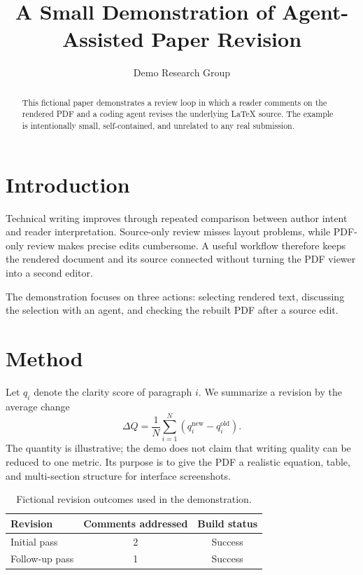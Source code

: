 \documentclass[10pt]{article}
\title{A Small Demonstration of Agent-Assisted Paper Revision}
\author{Demo Research Group}
\date{}
\begin{document}
\maketitle

\begin{abstract}
This fictional paper demonstrates a review loop in which a reader comments on
the rendered PDF and a coding agent revises the underlying LaTeX source. The
example is intentionally small, self-contained, and unrelated to any real
submission.
\end{abstract}

\section{Introduction}
Technical writing improves through repeated comparison between author intent
and reader interpretation. Source-only review misses layout problems, while
PDF-only review makes precise edits cumbersome. A useful workflow therefore
keeps the rendered document and its source connected without turning the PDF
viewer into a second editor.

The demonstration focuses on three actions: selecting rendered text, discussing
the selection with an agent, and checking the rebuilt PDF after a source edit.

\section{Method}
Let $q_i$ denote the clarity score of paragraph $i$. We summarize a revision by
the average change
\begin{equation}
  \Delta Q = \frac{1}{N}\sum_{i=1}^{N}\left(q_i^{\mathrm{new}}-q_i^{\mathrm{old}}\right).
\end{equation}
The quantity is illustrative; the demo does not claim that writing quality can
be reduced to one metric. Its purpose is to give the PDF a realistic equation,
table, and multi-section structure for interface screenshots.

\begin{table}[h]
  \centering
  \caption{Fictional revision outcomes used in the demonstration.}
  \begin{tabular}{lcc}
    \toprule
    Revision & Comments addressed & Build status \\
    \midrule
    Initial pass & 2 & Success \\
    Follow-up pass & 1 & Success \\
    \bottomrule
  \end{tabular}
\end{table}
\end{document}
